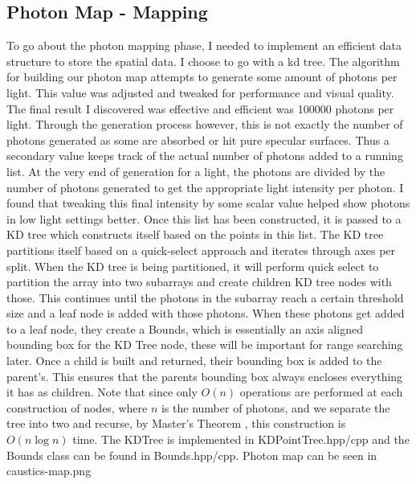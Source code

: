 \documentclass {article}
\begin{document}
\subsection{Photon Map - Mapping}
To go about the photon mapping phase, I needed to implement an efficient data
structure to store the spatial data. I choose to go with a kd tree. The algorithm 
for building our photon map attempts to generate some amount of photons per light. This value
was adjusted and tweaked for performance and visual quality. The final result I discovered was effective
and efficient 
was 100000 photons per light. Through the generation process however, this is not exactly the number
of photons generated as some are absorbed or hit pure specular surfaces. Thus a secondary value keeps
track of the actual number of photons added to a running list. At the very end of generation for a light,
the photons are divided by the number of photons generated to get the appropriate light intensity per photon.
I found that tweaking this final intensity by some scalar value helped show photons in low light settings better.
Once this list has been constructed, it is passed to a KD tree which constructs itself based on the points in
this list. The KD tree partitions itself based on a quick-select approach and iterates through
axes per split. When the KD tree is being partitioned, it will perform quick select to partition
the array into two subarrays and create children KD tree nodes with those. This continues until 
the photons in the subarray reach a certain threshold size and a leaf node is added with those photons.
When these photons get added to a leaf node, they create a Bounds, which is essentially an axis aligned bounding box
for the KD Tree node, these will be important for range searching later. Once a child is built and returned, their
bounding box is added to the parent's. This ensures that the parents bounding box always encloses everything it 
has as children. Note that since only $O(n)$ operations are performed at each construction of nodes, where
$n$ is the number of photons, and we separate the tree into two and recurse, by Master's Theorem \cite{cormen_2009}, this construction
is $O(n\log n)$ time. The KDTree is implemented in KDPointTree.hpp/cpp and the Bounds class can be found in Bounds.hpp/cpp.
Photon map can be seen in caustics-map.png
\end{document}
